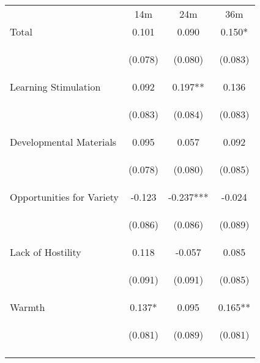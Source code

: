 \begin{tabular}{lccc}
\hline \noalign{\smallskip} & 14m & 24m & 36m\\
\noalign{\smallskip}\hline \noalign{\smallskip}Total & 0.101 & 0.090 & 0.150*\\
 & \begin{footnotesize}(0.078)\end{footnotesize} & \begin{footnotesize}(0.080)\end{footnotesize} & \begin{footnotesize}(0.083)\end{footnotesize}\\
\noalign{\smallskip}Learning Stimulation & 0.092 & 0.197** & 0.136\\
 & \begin{footnotesize}(0.083)\end{footnotesize} & \begin{footnotesize}(0.084)\end{footnotesize} & \begin{footnotesize}(0.083)\end{footnotesize}\\
\noalign{\smallskip}Developmental Materials & 0.095 & 0.057 & 0.092\\
 & \begin{footnotesize}(0.078)\end{footnotesize} & \begin{footnotesize}(0.080)\end{footnotesize} & \begin{footnotesize}(0.085)\end{footnotesize}\\
\noalign{\smallskip}Opportunities for Variety & -0.123 & -0.237*** & -0.024\\
 & \begin{footnotesize}(0.086)\end{footnotesize} & \begin{footnotesize}(0.086)\end{footnotesize} & \begin{footnotesize}(0.089)\end{footnotesize}\\
\noalign{\smallskip}Lack of Hostility & 0.118 & -0.057 & 0.085\\
 & \begin{footnotesize}(0.091)\end{footnotesize} & \begin{footnotesize}(0.091)\end{footnotesize} & \begin{footnotesize}(0.085)\end{footnotesize}\\
\noalign{\smallskip}Warmth & 0.137* & 0.095 & 0.165**\\
 & \begin{footnotesize}(0.081)\end{footnotesize} & \begin{footnotesize}(0.089)\end{footnotesize} & \begin{footnotesize}(0.081)\end{footnotesize}\\
\noalign{\smallskip}\hline\end{tabular}\\
